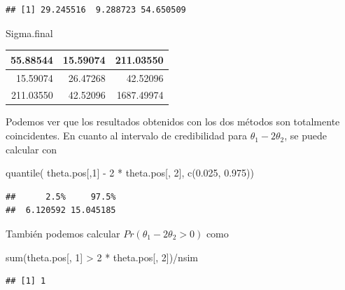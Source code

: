 \documentclass[
  10pt,
  spanish,
]{book}
\newenvironment{Shaded}{\begin{snugshade}}{\end{snugshade}}
\newcommand{\DecValTok}[1]{\textcolor[rgb]{0.00,0.00,0.81}{#1}}
\newcommand{\FloatTok}[1]{\textcolor[rgb]{0.00,0.00,0.81}{#1}}
\newcommand{\FunctionTok}[1]{\textcolor[rgb]{0.00,0.00,0.00}{#1}}
\newcommand{\NormalTok}[1]{#1}
\newcommand{\SpecialCharTok}[1]{\textcolor[rgb]{0.00,0.00,0.00}{#1}}
\theoremstyle{definition}
\theoremstyle{definition}
\theoremstyle{definition}
\theoremstyle{definition}
\theoremstyle{remark}
\begin{document}
\begin{verbatim}
## [1] 29.245516  9.288723 54.650509
\end{verbatim}

\begin{Shaded}
\begin{Highlighting}[]
\NormalTok{Sigma.final}
\end{Highlighting}
\end{Shaded}

\begin{tabular}{r|r|r}
\hline
55.88544 & 15.59074 & 211.03550\\
\hline
15.59074 & 26.47268 & 42.52096\\
\hline
211.03550 & 42.52096 & 1687.49974\\
\hline
\end{tabular}

Podemos ver que los resultados obtenidos con los dos métodos son totalmente coincidentes. En cuanto al intervalo de credibilidad para \(\theta_1-2\theta_2\), se puede calcular con

\begin{Shaded}
\begin{Highlighting}[]
\FunctionTok{quantile}\NormalTok{(}
\NormalTok{  theta.pos[,}\DecValTok{1}\NormalTok{] }\SpecialCharTok{{-}} \DecValTok{2} \SpecialCharTok{*}\NormalTok{ theta.pos[, }\DecValTok{2}\NormalTok{], }
  \FunctionTok{c}\NormalTok{(}\FloatTok{0.025}\NormalTok{, }\FloatTok{0.975}\NormalTok{))}
\end{Highlighting}
\end{Shaded}

\begin{verbatim}
##      2.5%     97.5% 
##  6.120592 15.045185
\end{verbatim}

También podemos calcular \(Pr(\theta_1-2\theta_2>0)\) como

\begin{Shaded}
\begin{Highlighting}[]
\FunctionTok{sum}\NormalTok{(theta.pos[, }\DecValTok{1}\NormalTok{] }\SpecialCharTok{\textgreater{}} \DecValTok{2} \SpecialCharTok{*}\NormalTok{ theta.pos[, }\DecValTok{2}\NormalTok{])}\SpecialCharTok{/}\NormalTok{nsim}
\end{Highlighting}
\end{Shaded}

\begin{verbatim}
## [1] 1
\end{verbatim}
\end{document}
